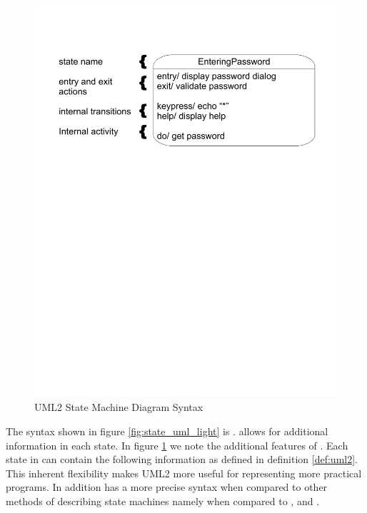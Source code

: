 \begin{figure}[htp]
    \centering
    \includegraphics[trim= 15mm 175mm 15mm 10mm, clip, width=\imgmedium]{./images/state_uml2_syntax_21_4.pdf} 
    \caption{UML2 State Machine Diagram Syntax \cite{UML2}}
    \label{fig:state_uml2}
\end{figure}

The syntax shown in figure \ref{fig:state_uml_light} is \cite{UML2}. \cite{UML2} allows for additional information in each state. In figure \ref{fig:state_uml2} we note the additional features of  \cite{UML2}. Each state in  \cite{UML2} can contain the following information as defined in definition \ref{def:uml2}. This inherent flexibility makes UML2 more useful for representing more practical programs. In addition  \cite{UML2} has a more precise syntax when compared to other methods of describing state machines namely when compared to \cite{booth}, and \cite{UML2}.

